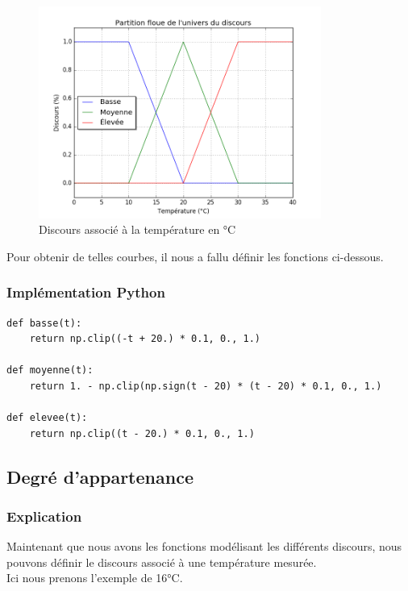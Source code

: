 \documentclass[a4paper]{article}
\begin{document}
\begin{figure}[h]
\begin{center}
	\includegraphics[width=350px]{plot_3.png}
\end{center}
\caption{Discours associé à la température en °C}
\end{figure}

Pour obtenir de telles courbes, il nous a fallu définir les fonctions ci-dessous.

\subsubsection{Implémentation Python}
\begin{lstlisting}
def basse(t):
    return np.clip((-t + 20.) * 0.1, 0., 1.)

def moyenne(t):
    return 1. - np.clip(np.sign(t - 20) * (t - 20) * 0.1, 0., 1.)

def elevee(t):
    return np.clip((t - 20.) * 0.1, 0., 1.)
\end{lstlisting}

\clearpage
\subsection{Degré d'appartenance}

\subsubsection{Explication}
Maintenant que nous avons les fonctions modélisant les différents discours, nous pouvons définir le discours associé à une température mesurée.\\
Ici nous prenons l'exemple de 16°C.
\end{document}
